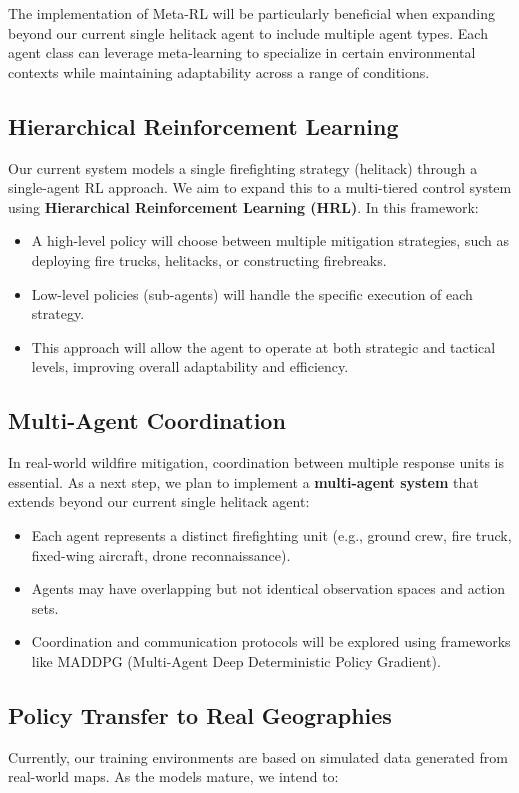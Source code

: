 \documentclass[conference]{IEEEtran}
\begin{document}
\noindent
The implementation of Meta-RL will be particularly beneficial when expanding beyond our current single helitack agent to include multiple agent types. Each agent class can leverage meta-learning to specialize in certain environmental contexts while maintaining adaptability across a range of conditions.

\subsection{Hierarchical Reinforcement Learning}
Our current system models a single firefighting strategy (helitack) through a single-agent RL approach. We aim to expand this to a multi-tiered control system using \textbf{Hierarchical Reinforcement Learning (HRL)}. In this framework:

\begin{itemize}
\item A high-level policy will choose between multiple mitigation strategies, such as deploying fire trucks, helitacks, or constructing firebreaks.
\item Low-level policies (sub-agents) will handle the specific execution of each strategy.
\item This approach will allow the agent to operate at both strategic and tactical levels, improving overall adaptability and efficiency.
\end{itemize}

\subsection{Multi-Agent Coordination}
In real-world wildfire mitigation, coordination between multiple response units is essential. As a next step, we plan to implement a \textbf{multi-agent system} that extends beyond our current single helitack agent:

\begin{itemize}
\item Each agent represents a distinct firefighting unit (e.g., ground crew, fire truck, fixed-wing aircraft, drone reconnaissance).
\item Agents may have overlapping but not identical observation spaces and action sets.
\item Coordination and communication protocols will be explored using frameworks like MADDPG (Multi-Agent Deep Deterministic Policy Gradient).
\end{itemize}

\subsection{Policy Transfer to Real Geographies}
Currently, our training environments are based on simulated data generated from real-world maps. As the models mature, we intend to:
\end{document}
